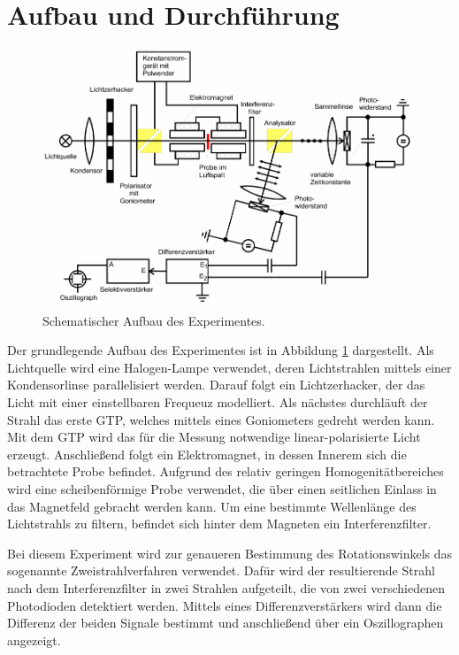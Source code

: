 \newpage
\section{Aufbau und Durchführung}

\begin{figure}
  \centering
  \includegraphics[width = \textwidth]{Pics/Aufbau.pdf}
  \caption{Schematischer Aufbau des Experimentes\cite{anleitung}.}
  \label{fig:Aufbau}
\end{figure}

Der grundlegende Aufbau des Experimentes ist in Abbildung \ref{fig:Aufbau}
dargestellt. Als Lichtquelle wird eine Halogen-Lampe verwendet, deren Lichtstrahlen
mittels einer Kondensorlinse parallelisiert werden. Darauf folgt ein Lichtzerhacker,
der das Licht mit einer einstellbaren Frequeuz modelliert. Als nächstes durchläuft
der Strahl das erste GTP, welches mittels eines Goniometers gedreht werden kann.
Mit dem GTP wird das für die Messung notwendige linear-polarisierte Licht erzeugt.
Anschließend folgt ein Elektromagnet, in dessen Innerem sich die betrachtete
Probe befindet. Aufgrund des relativ geringen Homogenitätbereiches wird eine
scheibenförmige Probe verwendet, die über einen seitlichen Einlass in das
Magnetfeld gebracht werden kann. Um eine bestimmte Wellenlänge des Lichtstrahls
zu filtern, befindet sich hinter dem Magneten ein Interferenzfilter.

Bei diesem Experiment wird zur genaueren Bestimmung des Rotationswinkels das
sogenannte Zweistrahlverfahren verwendet. Dafür wird der resultierende Strahl
nach dem Interferenzfilter in zwei Strahlen aufgeteilt, die von zwei verschiedenen
Photodioden detektiert werden. Mittels eines Differenzverstärkers wird dann die
Differenz der beiden Signale bestimmt und anschließend über ein Oszillographen
angezeigt.
